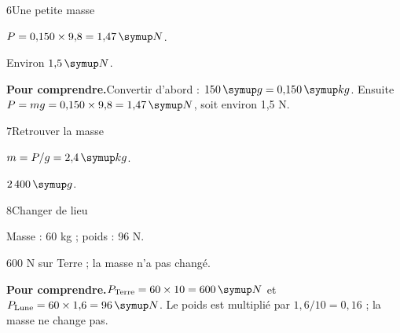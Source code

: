 \par\noindent\begin{minipage}{\linewidth}
\begin{corrige}{6}{Une petite masse}
\begin{questions}
\item $P=0{,}150\times9{,}8=1{,}47\unite N$.
\item Environ $1{,}5\unite N$.
\end{questions}
\par\smallskip\noindent\textbf{Pour comprendre.}\enspace Convertir d’abord : $150\unite g=0{,}150\unite{kg}$. Ensuite $P=mg=0{,}150\times9{,}8=1{,}47\unite N$, soit environ 1,5 N.\par
\end{corrige}
\end{minipage}
\par\noindent\begin{minipage}{\linewidth}
\begin{corrige}{7}{Retrouver la masse}
\begin{questions}
\item $m=P/g=2{,}4\unite{kg}$.
\item $2\,400\unite g$.
\end{questions}
\end{corrige}
\end{minipage}
\par\noindent\begin{minipage}{\linewidth}
\begin{corrige}{8}{Changer de lieu}
\begin{questions}
\item Masse : 60 kg ; poids : 96 N.
\item 600 N sur Terre ; la masse n’a pas changé.
\end{questions}
\par\smallskip\noindent\textbf{Pour comprendre.}\enspace $P_{\rm Terre}=60\times10=600\unite N$ et $P_{\rm Lune}=60\times1{,}6=96\unite N$. Le poids est multiplié par $1{,}6/10=0{,}16$ ; la masse ne change pas.\par
{}
\end{corrige}
\end{minipage}

